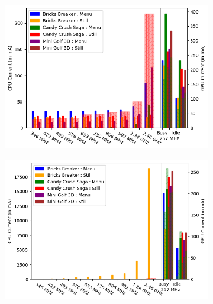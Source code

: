 \begin{figure}[tp]
    \centering
     \begin{subfigure}[b]{0.32\textwidth}
         \centering
         \includegraphics[width=\textwidth]{figures/002_Pixel2_16_micro_equations.png}
         \label{fig:number_parameters_vs_duration_100s_0}
     \end{subfigure}
    \begin{subfigure}[b]{0.32\textwidth}
         \centering
         \includegraphics[width=\textwidth]{figures/003_MotoZ3_16_micro_equations.png}
         \label{fig:number_parameters_vs_duration_100s_100}
     \end{subfigure}
    \begin{subfigure}[b]{0.32\textwidth}
         \centering

\end{subfigure}
\end{figure}
